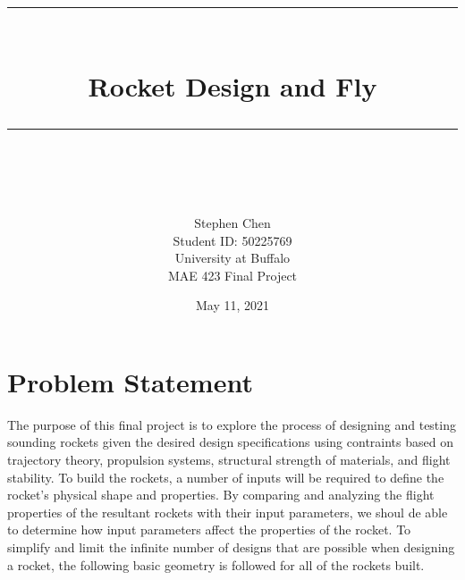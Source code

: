 \documentclass{report}
\newcommand{\HRule}[1]{\rule{\linewidth}{#1}}
\begin{document}
\title{ \normalsize \textsc{ }
		\\ [2.0cm]
		\HRule{1pt} \\
		\LARGE \textbf{Rocket Design and Fly}
		\HRule{1pt} \\ [0.5cm]
		\normalsize  \vspace*{5\baselineskip}}



\author{Stephen Chen \\
	Student ID: 50225769 \\ 
	University at Buffalo \\
	MAE 423 Final Project \\
}
        
        
\date {May 11, 2021}


\maketitle
\tableofcontents
\newpage

\sectionfont{\scshape}


\section*{Problem Statement}

The purpose of this final project is to explore the process of designing and testing sounding rockets given the desired design specifications using contraints based on trajectory theory, propulsion systems, structural strength of materials, and flight stability.
To build the rockets, a number of inputs will be required to define the rocket's physical shape and properties.
By comparing and analyzing the flight properties of the resultant rockets with their input parameters, we shoul de able to determine how input parameters affect the properties of the rocket.
To simplify and limit the infinite number of designs that are possible when designing a rocket, the following basic geometry is followed for all of the rockets built.
\end{document}
